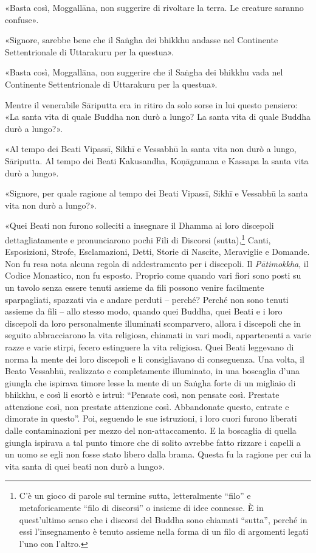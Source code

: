«Basta così, Moggallāna, non suggerire di rivoltare la terra. Le
creature saranno confuse».


«Signore, sarebbe bene che il Saṅgha dei bhikkhu andasse nel Continente
Settentrionale di Uttarakuru per la questua».


«Basta così, Moggallāna, non suggerire che il Saṅgha dei bhikkhu vada
nel Continente Settentrionale di Uttarakuru per la questua».


Mentre il venerabile Sāriputta era in ritiro da solo sorse in lui questo
pensiero: «La santa vita di quale Buddha non durò a lungo? La santa vita
di quale Buddha durò a lungo?».


«Al tempo dei Beati Vipassī, Sikhī e Vessabhū la santa vita non durò a
lungo, Sāriputta. Al tempo dei Beati Kakusandha, Koṇāgamana e Kassapa la
santa vita durò a lungo».


«Signore, per quale ragione al tempo dei Beati Vipassī, Sikhī e Vessabhū
la santa vita non durò a lungo?».


«Quei Beati non furono solleciti a insegnare il Dhamma ai loro discepoli
dettagliatamente e pronunciarono pochi Fili di Discorsi
(sutta),\footnote{C’è un gioco di parole sul termine sutta, letteralmente “filo” e metaforicamente “filo di discorsi” o insieme di idee connesse. È in quest’ultimo senso che i discorsi del Buddha sono chiamati “sutta”, perché in essi l’insegnamento è tenuto assieme nella forma di un filo di argomenti legati l’uno con l’altro.} Canti, Esposizioni, Strofe, Esclamazioni,
Detti, Storie di Nascite, Meraviglie e Domande. Non fu resa nota alcuna
regola di addestramento per i discepoli. Il \emph{Pātimokkha}, il Codice
Monastico, non fu esposto. Proprio come quando vari fiori sono posti su
un tavolo senza essere tenuti assieme da fili possono venire facilmente
sparpagliati, spazzati via e andare perduti – perché? Perché non sono
tenuti assieme da fili – allo stesso modo, quando quei Buddha, quei
Beati e i loro discepoli da loro personalmente illuminati scomparvero,
allora i discepoli che in seguito abbracciarono la vita religiosa,
chiamati in vari modi, appartenenti a varie razze e varie stirpi, fecero
estinguere la vita religiosa. Quei Beati leggevano di norma la mente dei
loro discepoli e li consigliavano di conseguenza. Una volta, il Beato
Vessabhū, realizzato e completamente illuminato, in una boscaglia d’una
giungla che ispirava timore lesse la mente di un Saṅgha forte di un
migliaio di bhikkhu, e così li esortò e istruì: “Pensate così, non
pensate così. Prestate attenzione così, non prestate attenzione così.
Abbandonate questo, entrate e dimorate in questo”. Poi, seguendo le sue
istruzioni, i loro cuori furono liberati dalle contaminazioni per mezzo
del non-attaccamento. E la boscaglia di quella giungla ispirava a tal
punto timore che di solito avrebbe fatto rizzare i capelli a un uomo se
egli non fosse stato libero dalla brama. Questa fu la ragione per cui la
vita santa di quei beati non durò a lungo».


